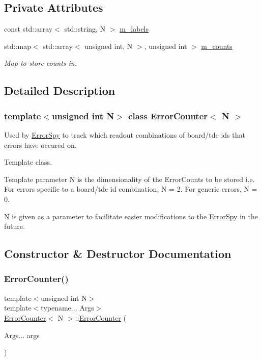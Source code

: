 \subsection*{Private Attributes}
\begin{DoxyCompactItemize}
\item 
const std\+::array$<$ std\+::string, N $>$ \hyperlink{class_error_counter_ac2f34a61c4c38ece96df182dd4b5c5ca}{m\+\_\+labels}
\item 
std\+::map$<$ std\+::array$<$ unsigned int, N $>$, unsigned int $>$ \hyperlink{class_error_counter_ac5903c289a98aa3fd0ac8294a83fa711}{m\+\_\+counts}
\begin{DoxyCompactList}\small\item\em Map to store counts in. \end{DoxyCompactList}\end{DoxyCompactItemize}


\subsection{Detailed Description}
\subsubsection*{template$<$unsigned int N$>$\newline
class Error\+Counter$<$ N $>$}

Used by \hyperlink{class_error_spy}{Error\+Spy} to track which readout combinations of board/tdc ids that errors have occured on. 

Template class.

Template parameter N is the dimensionality of the Error\+Counts to be stored i.\+e. For errors specific to a board/tdc id combination, N = 2. For generic errors, N = 0.

N is given as a parameter to facilitate easier modifications to the \hyperlink{class_error_spy}{Error\+Spy} in the future. 

\subsection{Constructor \& Destructor Documentation}
\mbox{\label{class_error_counter_a25c2e6afc0732afae9dcdbd1a6a7d84f}} 
\subsubsection{\texorpdfstring{Error\+Counter()}{ErrorCounter()}}
{\footnotesize\ttfamily template$<$unsigned int N$>$ \\
template$<$typename... Args$>$ \\
\hyperlink{class_error_counter}{Error\+Counter}$<$ N $>$\+::\hyperlink{class_error_counter}{Error\+Counter} (\begin{DoxyParamCaption}\item[{Args...}]{args }\end{DoxyParamCaption})}




